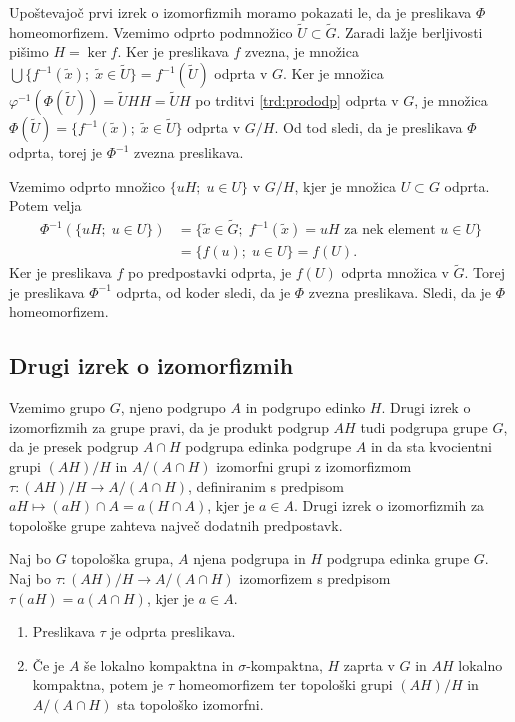 \documentclass[mat1]{fmfdelo}
\begin{document}
\begin{dokaz}
Upoštevajoč prvi izrek o izomorfizmih moramo pokazati le, da je preslikava $\Phi$ homeomorfizem. Vzemimo odprto podmnožico $\widetilde{U} \subset \widetilde{G}$. Zaradi lažje berljivosti pišimo $H = \ker f$.
Ker je preslikava $f$ zvezna, je množica $\bigcup\lbrace f^{-1}(\tilde{x}) ;\; \tilde{x} \in \widetilde{U} \rbrace = f^{-1}(\widetilde{U})$ odprta v $G$. Ker je množica $\varphi^{-1}(\Phi(\widetilde{U})) = \widetilde{U}HH = \widetilde{U}H$ po trditvi \ref{trd:prododp} odprta v $G$, je množica $\Phi(\widetilde{U}) = \lbrace f^{-1}(\tilde{x}) ;\; \tilde{x} \in \widetilde{U} \rbrace$ odprta v $G/H$. Od tod sledi, da je preslikava $\Phi$ odprta, torej je $\Phi^{-1}$ zvezna preslikava.

Vzemimo odprto množico $\lbrace uH ;\; u \in U \rbrace$ v $G/H$, kjer je množica $U \subset G$ odprta. Potem velja
\begin{align*}
\Phi^{-1}(\lbrace uH ;\; u \in U \rbrace) &= \lbrace \tilde{x} \in \widetilde{G} ;\; f^{-1}(\tilde{x}) = uH \text{ za nek element } u \in U \rbrace \\
&= \lbrace f(u) ;\; u \in U \rbrace = f(U).
\end{align*}
Ker je preslikava $f$ po predpostavki odprta, je $f(U)$ odprta množica v $\widetilde{G}$. Torej je preslikava $\Phi^{-1}$ odprta, od koder sledi, da je $\Phi$ zvezna preslikava. Sledi, da je $\Phi$ homeomorfizem.
\end{dokaz}

\subsection{Drugi izrek o izomorfizmih}
Vzemimo grupo $G$, njeno podgrupo $A$ in podgrupo edinko $H$. Drugi izrek o izomorfizmih za grupe pravi, da je produkt podgrup $AH$ tudi podgrupa grupe $G$, da je presek podgrup $A \cap H$ podgrupa edinka podgrupe $A$ in da sta kvocientni grupi $(AH)/H$ in $A/(A \cap H)$ izomorfni grupi z izomorfizmom $\tau\colon (AH)/H \to A/(A \cap H)$, definiranim s predpisom $aH \mapsto (aH)\cap A = a(H \cap A)$, kjer je $a \in A$. Drugi izrek o izomorfizmih za topološke grupe zahteva največ dodatnih predpostavk.
\begin{izrek}\label{izr:drugitopizrek}
Naj bo $G$ topološka grupa, $A$ njena podgrupa in $H$ podgrupa edinka grupe $G$. Naj bo $\tau\colon (AH)/H \to A/(A \cap H)$ izomorfizem s predpisom $\tau (aH) = a(A \cap H)$, kjer je $a \in A$.
\begin{enumerate}
\item Preslikava $\tau$ je odprta preslikava. \label{podtrd:ioi2-1}
\item Če je $A$ še lokalno kompaktna in $\sigma$-kompaktna, $H$ zaprta v $G$ in $AH$ lokalno kompaktna, potem je $\tau$ homeomorfizem ter topološki grupi $(AH)/H$ in $A/(A \cap H)$ sta topološko izomorfni. \label{podtrd:ioi2-2}
\end{enumerate}
\end{izrek}
\end{document}
